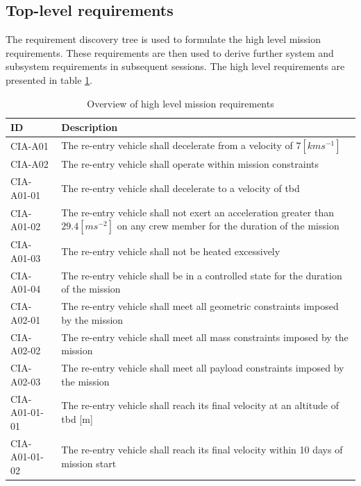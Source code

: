 \subsection{Top-level requirements}
The requirement discovery tree is used to formulate the high level mission requirements. These requirements are then used to derive further system and subsystem requirements in subsequent sessions. The high level requirements are presented in table \ref{tab:toplevelreq}.

\begin{table}[H]
	\caption{Overview of high level mission requirements} \label{tab:toplevelreq}
	\begin{tabular}{|p{}|p{}|}
    \hline
    ID          & Description                                                                                                      \\ \hline \hline
    CIA-A01 & The re-entry vehicle shall decelerate from a velocity of $7[kms^{-1}]$ \\ \hline
    CIA-A02 & The re-entry vehicle shall operate within mission constraints                                               \\ \hline
    CIA-A01-01 & The re-entry vehicle shall decelerate to a velocity of \gls{tbd}     \\ \hline
    CIA-A01-02 & The re-entry vehicle shall not exert an acceleration greater than $29.4 [ms^{-2}]$ on any crew member for the duration of the mission			\\ \hline
    CIA-A01-03 & The re-entry vehicle shall not be heated excessively  \\ \hline
    CIA-A01-04 & The re-entry vehicle shall be in a controlled state for the duration of the mission                            \\ \hline
    CIA-A02-01 & The re-entry vehicle shall meet all geometric constraints imposed by the mission                           \\ \hline
    CIA-A02-02 & The re-entry vehicle shall meet all mass constraints imposed by the mission                                      \\ \hline
	CIA-A02-03 & The re-entry vehicle shall meet all payload constraints imposed by the mission \\ \hline
	CIA-A01-01-01 & The re-entry vehicle shall reach its final velocity at an altitude of \gls{tbd} [m] \\ \hline
	CIA-A01-01-02 & The re-entry vehicle shall reach its final velocity within 10 days of mission start \\ \hline
    \end{tabular}
\end{table}










